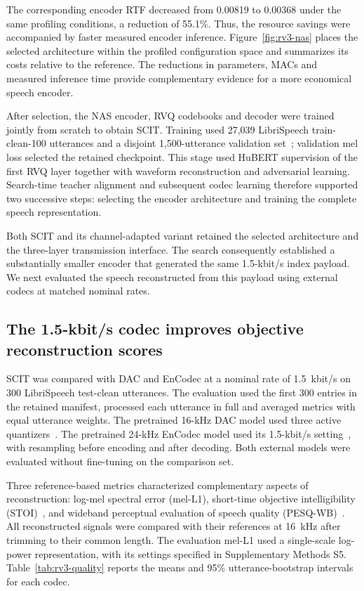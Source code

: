 The corresponding encoder RTF decreased from 0.00819 to 0.00368 under the same profiling conditions, a reduction of 55.1\%. Thus, the resource savings were accompanied by faster measured encoder inference. Figure~\ref{fig:rv3-nas} places the selected architecture within the profiled configuration space and summarizes its costs relative to the reference. The reductions in parameters, MACs and measured inference time provide complementary evidence for a more economical speech encoder.

After selection, the NAS encoder, RVQ codebooks and decoder were trained jointly from scratch to obtain SCIT. Training used 27,039 LibriSpeech train-clean-100 utterances and a disjoint 1,500-utterance validation set~\cite{librispeech}; validation mel loss selected the retained checkpoint. This stage used HuBERT supervision of the first RVQ layer together with waveform reconstruction and adversarial learning. Search-time teacher alignment and subsequent codec learning therefore supported two successive steps: selecting the encoder architecture and training the complete speech representation.

Both SCIT and its channel-adapted variant retained the selected architecture and the three-layer transmission interface. The search consequently established a substantially smaller encoder that generated the same 1.5-kbit/s index payload. We next evaluated the speech reconstructed from this payload using external codecs at matched nominal rates.

\subsection{The 1.5-kbit/s codec improves objective reconstruction scores}
\label{sec:rv3-quality}
SCIT was compared with DAC and EnCodec at a nominal rate of 1.5~kbit/s on 300 LibriSpeech test-clean utterances. The evaluation used the first 300 entries in the retained manifest, processed each utterance in full and averaged metrics with equal utterance weights. The pretrained 16-kHz DAC model used three active quantizers~\cite{dac}. The pretrained 24-kHz EnCodec model used its 1.5-kbit/s setting~\cite{encodec}, with resampling before encoding and after decoding. Both external models were evaluated without fine-tuning on the comparison set.



Three reference-based metrics characterized complementary aspects of reconstruction: log-mel spectral error (mel-L1), short-time objective intelligibility (STOI)~\cite{stoi}, and wideband perceptual evaluation of speech quality (PESQ-WB)~\cite{pesq}. All reconstructed signals were compared with their references at 16~kHz after trimming to their common length. The evaluation mel-L1 used a single-scale log-power representation, with its settings specified in Supplementary Methods S5. Table~\ref{tab:rv3-quality} reports the means and 95\% utterance-bootstrap intervals for each codec.

